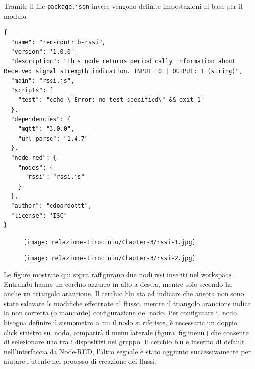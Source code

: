 \documentclass[a4paper,10pt]{memoir}
\begin{document}
Tramite il file \texttt{package.json} invece vengono definite impostazioni di base per il modulo.
\begin{lstlisting}
{
  "name": "red-contrib-rssi",
  "version": "1.0.0",
  "description": "This node returns periodically information about Received signal strength indication. INPUT: 0 | OUTPUT: 1 (string)",
  "main": "rssi.js",
  "scripts": {
    "test": "echo \"Error: no test specified\" && exit 1"
  },
  "dependencies": {
    "mqtt": "3.0.0",
    "url-parse": "1.4.7"
  },
  "node-red": {
    "nodes": {
      "rssi": "rssi.js"
    }
  },
  "author": "edoardottt",
  "license": "ISC"
}
\end{lstlisting}

\begin{figure}[ht]
    \texttt{[image: relazione-tirocinio/Chapter-3/rssi-1.jpg]}
    \label{fig:rssi-1}
\end{figure}
\begin{figure}[ht]
    \texttt{[image: relazione-tirocinio/Chapter-3/rssi-2.jpg]}
    \label{fig:rssi-2}
\end{figure}
Le figure mostrate qui sopra raffigurano due nodi rssi inseriti nel workspace.
Entrambi hanno un cerchio azzurro in alto a destra, mentre solo secondo ha anche un triangolo arancione.
Il cerchio blu sta ad indicare che ancora non sono state salavate le modifiche effettuate al flusso, mentre il triangolo arancione indica la non corretta (o mancante) configurazione del nodo.
Per configurare il nodo bisogna definire il sismometro a cui il nodo si riferisce, è necessario un doppio click sinistro sul nodo, comparirà il menu laterale (figura \ref{fig:menu}) che consente di selezionare uno tra i dispositivi nel gruppo.
Il cerchio blu è inserito di default nell'interfaccia da Node-RED, l'altro segnale è stato aggiunto successivamente per aiutare l'utente nel processo di creazione dei flussi.
\end{document}
